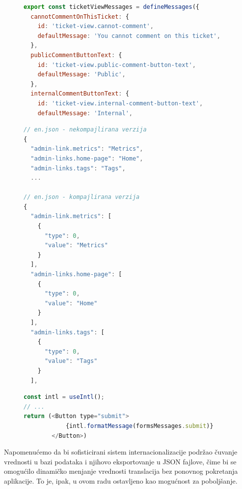 \documentclass[12pt,oneside]{memoir}
\begin{document}
\begin{figure}[h]
\begin{lstlisting}[language=JavaScript, style=ES6, caption={Definisanje poruka.}, label={lst:definingmessages}]
export const ticketViewMessages = defineMessages({
  cannotCommentOnThisTicket: {
    id: 'ticket-view.cannot-comment',
    defaultMessage: 'You cannot comment on this ticket',
  },
  publicCommentButtonText: {
    id: 'ticket-view.public-comment-button-text',
    defaultMessage: 'Public',
  },
  internalCommentButtonText: {
    id: 'ticket-view.internal-comment-button-text',
    defaultMessage: 'Internal',

\end{lstlisting}
\end{figure}

\begin{figure}[h]
\begin{lstlisting}[language=JavaScript, style=ES6, caption={JSON fajlovi sa porukama.}, label={lst:messagsjsonfiles}]
// en.json - nekompajlirana verzija
{
  "admin-link.metrics": "Metrics",
  "admin-links.home-page": "Home",
  "admin-links.tags": "Tags",
  ...

// en.json - kompajlirana verzija
{
  "admin-link.metrics": [
    {
      "type": 0,
      "value": "Metrics"
    }
  ],
  "admin-links.home-page": [
    {
      "type": 0,
      "value": "Home"
    }
  ],
  "admin-links.tags": [
    {
      "type": 0,
      "value": "Tags"
    }
  ],
\end{lstlisting}
\end{figure}

\begin{figure}[h]
\begin{lstlisting}[language=JavaScript, style=ES6, caption={Korišćenje poruka}, label={lst:messagesusage}]
const intl = useIntl();
// ...
return (<Button type="submit">
            {intl.formatMessage(formsMessages.submit)}
        </Button>)
\end{lstlisting}
\end{figure}

Napomenućemo da bi sofisticirani sistem internacionalizacije podržao čuvanje vrednosti u bazi podataka i njihovo eksportovanje u JSON fajlove, čime bi se omogućilo dinamičko menjanje vrednosti translacija bez ponovnog pokretanja aplikacije. To je, ipak, u ovom radu ostavljeno kao mogućnost za poboljšanje.

\end{document}
